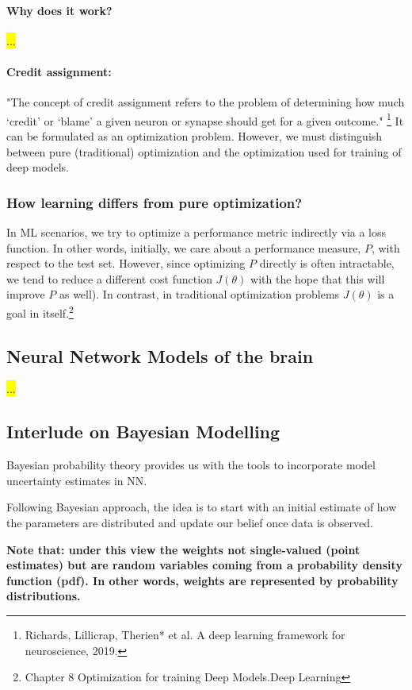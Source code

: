 \documentclass[main]{subfiles}
\begin{document}
\paragraph{Why does it work?}
\hl{...}
\paragraph{Credit assignment:} "The concept of credit assignment refers to the problem of determining how much ‘credit’ or ‘blame’ a given neuron or synapse should get for a given outcome." \footnote{Richards, Lillicrap, Therien* et al. A deep learning framework for neuroscience, 2019.}
\noindent It can be formulated as an optimization problem. However, we must distinguish between pure (traditional) optimization and the optimization used for training of deep models.

\subsubsection{How learning differs from pure optimization?}
In ML scenarios, we try to optimize a performance metric indirectly via a loss function. In other words, initially, we care about a performance measure, $P$, with respect to the test set. However, since optimizing $P$ directly is often intractable, we tend to reduce a different cost function $J(\theta)$ with the hope that this will improve $P$ as well). In contrast, in traditional optimization problems $J(\theta)$ is a goal in itself.\footnote{Chapter 8 Optimization for training Deep Models.Deep Learning}
    

\subsection{Neural Network Models of the brain}
\hl{...}

\subsection{Interlude on Bayesian Modelling}
Bayesian probability theory provides us with the tools to incorporate model uncertainty estimates in NN.
   
\noindent Following Bayesian approach, the idea is to start with an initial estimate of how the parameters are distributed and update our belief once data is observed. 

\noindent
\textbf{Note that: under this view the weights not single-valued (point estimates) but are random variables coming from a probability density function (pdf). In other words, weights are represented by probability distributions.}
\end{document}
